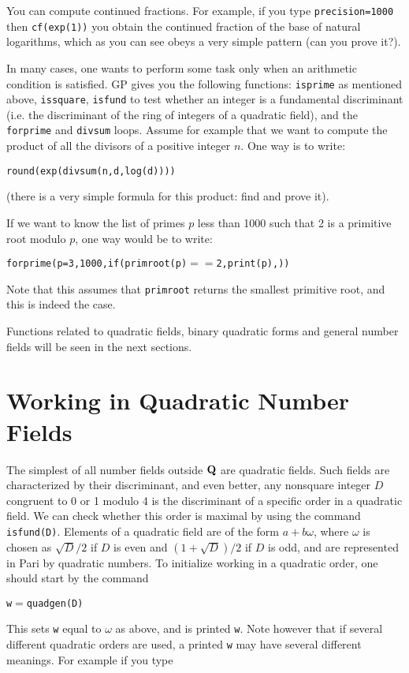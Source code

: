 You can compute continued fractions. For example, if you type 
{\tt\bs precision=1000} then {\tt cf(exp(1))} you obtain the continued fraction
of the base of natural logarithms, which as you can see obeys a very simple
pattern (can you prove it?).

In many cases, one wants to perform some task only when an arithmetic condition
is satisfied. GP gives you the following functions: {\tt isprime} as mentioned
above, {\tt issquare}, {\tt isfund} to test whether an integer is a fundamental
discriminant (i.e. the discriminant of the ring of integers of a quadratic 
field), and the {\tt forprime} and {\tt divsum} loops. Assume for example that
we want to compute the product of all the divisors of a positive integer $n$.
One way is to write:

\centerline{\tt round(exp(divsum(n,d,log(d))))}

(there is a very simple formula for this product: find and prove it).

If we want to know the list of primes $p$ less than 1000 such that 2 is a
primitive root modulo $p$, one way would be to write:

\centerline{\tt forprime(p=3,1000,if(primroot(p)$==$2,print(p),))}

Note that this assumes that {\tt primroot} returns the smallest primitive root,
and this is indeed the case.

Functions related to quadratic fields, binary quadratic forms and general
number fields will be seen in the next sections.
\medskip
\section{Working in Quadratic Number Fields}
\medskip
The simplest of all number fields outside ${\bf Q}$ are quadratic fields. Such 
fields are characterized by their discriminant, and even better, any nonsquare
integer $D$ congruent to 0 or 1 modulo 4 is the discriminant of a specific
order in a quadratic field. We can check whether this order is maximal by
using the command {\tt isfund(D)}.
Elements of a quadratic field are of the form $a+b\omega$, where $\omega$ is
chosen as $\sqrt{D}/2$ if $D$ is even and $(1+\sqrt{D})/2$ if $D$ is odd,
and are represented in Pari by quadratic numbers. To initialize working in
a quadratic order, one should start by the command 

\centerline{\tt w$=$quadgen(D)}

This sets {\tt w} equal to $\omega$ as above, and is printed {\tt w}. Note
however that if several different quadratic orders are used, a printed {\tt w}
may have several different meanings. For example if you type

